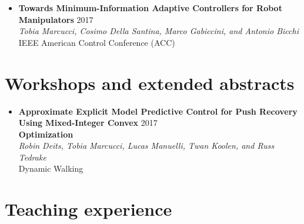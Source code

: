 \documentclass[11pt,a4paper,sans]{moderncv}
\begin{document}
\begin{itemize}
\item \textbf{Towards Minimum-Information Adaptive Controllers for Robot Manipulators} \hfill 2017 \\
\textit{Tobia Marcucci, Cosimo Della Santina, Marco Gabiccini, and Antonio Bicchi} \\
IEEE American Control Conference (ACC)

\end{itemize}

\section{Workshops and extended abstracts}

\vspace{5pt}

\begin{itemize}
	


\item \textbf{Approximate Explicit Model Predictive Control for Push Recovery Using Mixed-Integer Convex} \hfill 2017 \\
\textbf{Optimization} \\
\textit{Robin Deits, Tobia Marcucci, Lucas Manuelli, Twan Koolen, and Russ Tedrake} \\
Dynamic Walking

\end{itemize}

\section{Teaching experience}
\end{document}
